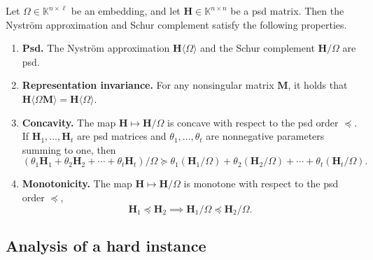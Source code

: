 \documentclass[11pt]{article}
\newcommand{\field}{\mathbb{K}}
\newcommand{\mat}[1]{\boldsymbol{#1}}
\theoremstyle{definition}
\numberwithin{equation}{section}
\begin{document}
\begin{fact} \label{fact:nystrom-properties}
    Let $\mat{\varOmega} \in \field^{n\times \ell}$ be an embedding, and let $\mat{H} \in \field^{n\times n}$ be a psd matrix.
    Then the Nystr\"om approximation and Schur complement satisfy the following properties. 
    \begin{enumerate}[label=(\alph*)]
        \item \textbf{Psd.}
        The Nystr\"om approximation $\mat{H}\langle \mat{\varOmega}\rangle$ and the Schur complement $\mat{H} / \mat{\varOmega}$ are psd. \label{item:nystrom-positive}     
        \item \textbf{Representation invariance.}
        For any nonsingular matrix $\mat{M}$, it holds that $\mat{H}\langle \mat{\varOmega}\mat{M}\rangle = \mat{H}\langle \mat{\varOmega}\rangle$. \label{item:nystrom-invariance}
        \item \label{item:nystrom-concave} \textbf{Concavity.}
        The map $\mat{H} \mapsto \mat{H} / \mat{\varOmega}$ is concave with respect to the psd order $\preccurlyeq$. If $\mat{H}_1,\ldots,\mat{H}_t$ are psd matrices and $\theta_1,\ldots,\theta_t$ are nonnegative parameters summing to one, then
        \begin{equation*}
            (\theta_1 \mat{H}_1 + \theta_2 \mat{H}_2 + \cdots + \theta_t \mat{H}_t)/ \mat{\varOmega} \succcurlyeq \theta_1 (\mat{H}_1/\mat{\varOmega}) + \theta_2 (\mat{H}_2/\mat{\varOmega}) + \cdots + \theta_t (\mat{H}_t / \mat{\varOmega}).
        \end{equation*}
        \item  \label{item:nystrom-monotone} \textbf{Monotonicity.}
        The map $\mat{H} \mapsto \mat{H} / \mat{\varOmega}$ is monotone with respect to the psd order $\preccurlyeq$,
        \begin{equation*}
            \mat{H}_1 \preccurlyeq \mat{H}_2 \implies \mat{H}_1 / \mat{\varOmega} \preccurlyeq \mat{H}_2 / \mat{\varOmega}.
        \end{equation*}
    \end{enumerate}
\end{fact}
%

\subsection{Analysis of a hard instance} \label{sec:hard_instance}
\end{document}
